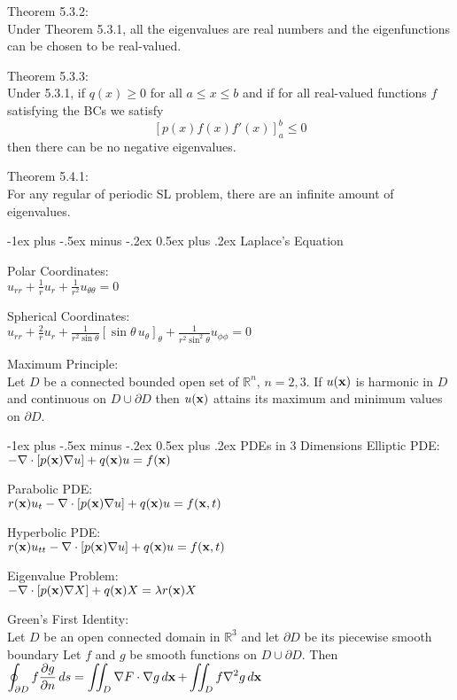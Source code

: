 \documentclass[12pt,landscape]{article}
\makeatletter
\renewcommand{\section}{\@startsection{section}{1}{0mm}%
                                {-1ex plus -.5ex minus -.2ex}%
                                {0.5ex plus .2ex}%
                                {\normalfont\normalsize\bfseries}}
\newcommand{\tab}{\hspace*{1em}}
\newcommand{\ds}{\displaystyle}
\renewcommand{\grad}{\nabla}
\renewcommand{\div}[1]{\nabla\cdot#1}
\theoremstyle{definition}
\makeatother
\begin{document}
\begin{multicols*}{3}
Theorem 5.3.2:\\
\tab Under Theorem 5.3.1, all the eigenvalues are real numbers and the eigenfunctions can be chosen to be real-valued.

Theorem 5.3.3:\\
\tab Under 5.3.1, if $q(x) \geq 0$ for all $a \leq x \leq b$ and if for all real-valued functions $f$ satisfying the BCs we satisfy
$$[p(x)f(x)f'(x)]_a^b \leq 0$$
then there can be no negative eigenvalues.

Theorem 5.4.1:\\
\tab For any regular of periodic SL problem, there are an infinite amount of eigenvalues.

\section{Laplace's Equation}

Polar Coordinates:\\
\tab $\ds u_{rr} + \frac{1}{r}u_r + \frac{1}{r^2} u_{\theta \theta} = 0$

Spherical Coordinates:\\
\tab $\ds u_{rr} + \frac{2}{r}u_r + \frac{1}{r^2 \sin\theta}\left[\sin\theta \,u_\theta\right]_\theta + \frac{1}{r^2\sin^2\theta}u_{\phi\phi} = 0$

Maximum Principle:\\
\tab Let $D$ be a connected bounded open set of $\mathbb{R}^n$, $n = 2, 3$. If $u(\vb{x})$ is harmonic in $D$ and continuous on $D \cup \partial D$ then $u(\vb{x})$ attains its maximum and minimum values on $\partial D$.

\section{PDEs in 3 Dimensions}
Elliptic PDE:\\
\tab $-\div[p(\vb{x})\grad{u}] + q(\vb{x}) u = f(\vb{x})$

Parabolic PDE:\\
\tab $r(\vb{x})u_t -\div[p(\vb{x})\grad{u}] + q(\vb{x}) u = f(\vb{x}, t)$

Hyperbolic PDE:\\
\tab $r(\vb{x})u_{tt} -\div[p(\vb{x})\grad{u}] + q(\vb{x}) u = f(\vb{x}, t)$

Eigenvalue Problem:\\
\tab $-\div[p(\vb{x})\grad{X}] + q(\vb{x}) X = \lambda r(\vb{x})X$

Green's First Identity:\\
\tab Let $D$ be an open connected domain in $\mathbb{R}^3$ and let $\partial D$ be its piecewise smooth boundary Let $f$ and $g$ be smooth functions on $D \cup \partial D$. Then\\
\tab $\ds \oint_{\partial D} f \pdv{g}{n}\mathop{ds} = \iint_{D}\grad{F}\cdot\grad{g}\mathop{d\vb{x}} + \iint_{D} f \grad^2{g}\mathop{d\vb{x}}$


\end{multicols*}
\end{document}
